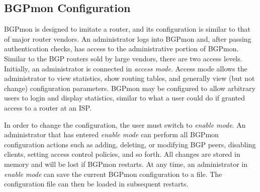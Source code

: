 
%
%
%
%

\subsection{BGPmon Configuration}

BGPmon is designed to imitate a router, and its configuration is similar to that of major router vendors.   An administrator logs into BGPmon and, after passing authentication checks,  has access to the administrative portion of BGPmon.   Similar to the BGP routers sold by large vendors,  there are two access levels.    Initially, an administrator is connected in \emph{access mode}.   Access mode allows the administrator to view statistics, show routing tables, and generally view (but not change) configuration parameters.    BGPmon may be configured to allow arbitrary users to login and display statistics,  similar to what a user could do if granted access to a router at an ISP.    

In order to change the configuration,  the user must switch to \emph{enable mode}.   An administrator that has entered \emph{enable mode} can perform all BGPmon configuration actions such as adding, deleting, or modifying BGP peers,  disabling clients, setting access control policies, and so forth.    All changes are stored in memory and will be lost if BGPmon restarts.   At any time, an administrator in \emph{enable mode} can save the current BGPmon configuration to a file.      The configuration file can then be loaded in subsequent restarts.    

